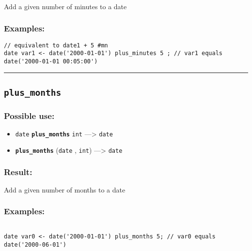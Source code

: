 \documentclass[]{book}
\providecommand{\tightlist}{%
  \setlength{\itemsep}{0pt}\setlength{\parskip}{0pt}}
\theoremstyle{definition}
\theoremstyle{definition}
\theoremstyle{definition}
\theoremstyle{remark}
\begin{document}
Add a given number of minutes to a date

\subsubsection{Examples:}\label{examples-278}

\begin{verbatim}
// equivalent to date1 + 5 #mn  
date var1 <- date('2000-01-01') plus_minutes 5 ; // var1 equals date('2000-01-01 00:05:00')
\end{verbatim}

\begin{center}\rule{0.5\linewidth}{\linethickness}\end{center}

\subsection{\texorpdfstring{\texttt{plus\_months}}{plus\_months}}\label{plus_months}

\subsubsection{Possible use:}\label{possible-use-404}

\begin{itemize}
\tightlist
\item
  \texttt{date} \textbf{\texttt{plus\_months}} \texttt{int}
  ---\textgreater{} \texttt{date}
\item
  \textbf{\texttt{plus\_months}} (\texttt{date} , \texttt{int})
  ---\textgreater{} \texttt{date}
\end{itemize}

\subsubsection{Result:}\label{result-390}

Add a given number of months to a date

\subsubsection{Examples:}\label{examples-279}

\begin{verbatim}
 
date var0 <- date('2000-01-01') plus_months 5; // var0 equals date('2000-06-01')
\end{verbatim}
\end{document}
